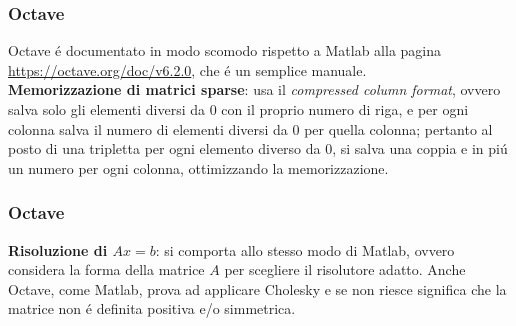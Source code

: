 \documentclass{beamer}
\begin{document}
\begin{frame}
\frametitle{Octave}
Octave \'e documentato in modo scomodo rispetto a Matlab alla pagina \url{https://octave.org/doc/v6.2.0}, che \'e un semplice manuale. \\
\textbf{Memorizzazione di matrici sparse}: usa il \textit{compressed column format}, ovvero salva solo gli elementi diversi da 0 con il proprio numero di riga, e per ogni colonna salva il numero di elementi diversi da 0 per quella colonna; pertanto al posto di una tripletta per ogni elemento diverso da 0, si salva una coppia e in pi\'u un numero per ogni colonna, ottimizzando la memorizzazione.
\end{frame} 
\begin{frame}
\frametitle{Octave}
\textbf{Risoluzione di $Ax = b$}: si comporta allo stesso modo di Matlab, ovvero considera la forma della matrice $A$ per scegliere il risolutore adatto. Anche Octave, come Matlab, prova ad applicare Cholesky e se non riesce significa che la matrice non \'e definita positiva e/o simmetrica.
\end{frame}
\end{document}
